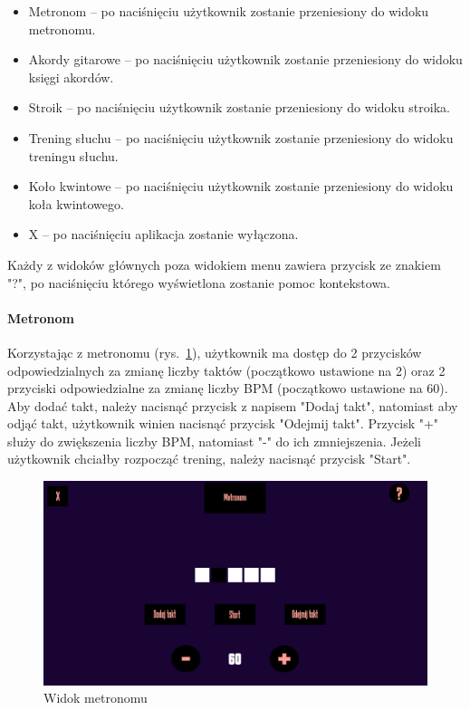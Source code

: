 \begin{itemize}
    \item Metronom -- po naciśnięciu użytkownik zostanie przeniesiony do widoku metronomu.
    \item Akordy gitarowe -- po naciśnięciu użytkownik zostanie przeniesiony do widoku księgi akordów.
    \item Stroik -- po naciśnięciu użytkownik zostanie przeniesiony do widoku stroika.
    \item Trening słuchu -- po naciśnięciu użytkownik zostanie przeniesiony do widoku treningu słuchu.
    \item Koło kwintowe -- po naciśnięciu użytkownik zostanie przeniesiony do widoku koła kwintowego.
    \item X -- po naciśnięciu aplikacja zostanie wyłączona.
\end{itemize}
Każdy z widoków głównych poza widokiem menu zawiera przycisk ze znakiem "?", po naciśnięciu którego wyświetlona zostanie pomoc kontekstowa.






\paragraph{Metronom}

Korzystając z metronomu (rys.~\ref{fig:Metronom}), użytkownik ma dostęp do 2 przycisków odpowiedzialnych za zmianę liczby taktów (początkowo ustawione na 2) oraz 2 przyciski odpowiedzialne za zmianę liczby BPM (początkowo ustawione na 60). Aby dodać takt, należy nacisnąć przycisk z napisem "Dodaj takt", natomiast aby odjąć takt, użytkownik winien nacisnąć przycisk "Odejmij takt". Przycisk "+" służy do zwiększenia liczby BPM, natomiast "-" do ich zmniejszenia. Jeżeli użytkownik chciałby rozpocząć trening, należy nacisnąć przycisk "Start".

\begin{figure}[htb]
	\centering
	\includegraphics[width=.50\linewidth]{rysB/METRO.png}
	\caption{Widok metronomu} \label{fig:Metronom}
\end{figure}


